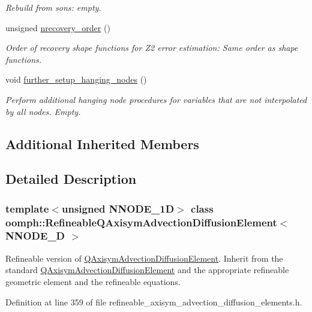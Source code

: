 \begin{DoxyCompactItemize}
\begin{DoxyCompactList}\small\item\em Rebuild from sons\+: empty. \end{DoxyCompactList}\item 
unsigned \hyperlink{classoomph_1_1RefineableQAxisymAdvectionDiffusionElement_a2e76935da40425bf2a099f1f25e51f1c}{nrecovery\+\_\+order} ()
\begin{DoxyCompactList}\small\item\em Order of recovery shape functions for Z2 error estimation\+: Same order as shape functions. \end{DoxyCompactList}\item 
void \hyperlink{classoomph_1_1RefineableQAxisymAdvectionDiffusionElement_a876b090aa3813d3837218a5aecb64404}{further\+\_\+setup\+\_\+hanging\+\_\+nodes} ()
\begin{DoxyCompactList}\small\item\em Perform additional hanging node procedures for variables that are not interpolated by all nodes. Empty. \end{DoxyCompactList}\end{DoxyCompactItemize}
\subsection*{Additional Inherited Members}


\subsection{Detailed Description}
\subsubsection*{template$<$unsigned N\+N\+O\+D\+E\+\_\+1D$>$\newline
class oomph\+::\+Refineable\+Q\+Axisym\+Advection\+Diffusion\+Element$<$ N\+N\+O\+D\+E\+\_\+D $>$}

Refineable version of \hyperlink{classoomph_1_1QAxisymAdvectionDiffusionElement}{Q\+Axisym\+Advection\+Diffusion\+Element}. Inherit from the standard \hyperlink{classoomph_1_1QAxisymAdvectionDiffusionElement}{Q\+Axisym\+Advection\+Diffusion\+Element} and the appropriate refineable geometric element and the refineable equations. 

Definition at line 359 of file refineable\+\_\+axisym\+\_\+advection\+\_\+diffusion\+\_\+elements.\+h.



